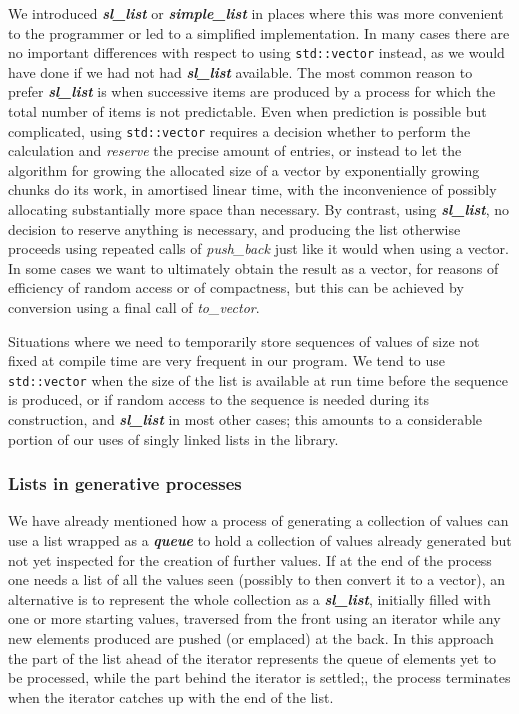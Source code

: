 \documentclass[12pt]{article}
\theoremstyle{plain}
\theoremstyle{definition}
\newcommand\std[1]{\texttt{std::#1}}
\def\vect.{\std{vector}}
\def\slls.{\textbf{\textit{sl\_\!list}}}
\def\smpl.{\textbf{\textit{simple\_\!list}}}
\def\queue.{\textbf{\textit{queue}}}
\begin{document}
We introduced \slls. or \smpl. in places where this was more convenient to the
programmer or led to a simplified implementation. In many cases there are no
important differences with respect to using \vect. instead, as we would have
done if we had not had \slls. available. The most common reason to prefer \slls.
is when successive items are produced by a process for which the total number of
items is not predictable. Even when prediction is possible but complicated,
using \vect. requires a decision whether to perform the calculation and
\textit{reserve} the precise amount of entries, or instead to let the algorithm
for growing the allocated size of a vector by exponentially growing chunks do
its work, in amortised linear time, with the inconvenience of possibly
allocating substantially more space than necessary. By contrast, using \slls.,
no decision to reserve anything is necessary, and producing the list otherwise
proceeds using repeated calls of \textit{push\_\!back} just like it would when
using a vector. In some cases we want to ultimately obtain the result as a
vector, for reasons of efficiency of random access or of compactness, but
this can be achieved by conversion using a final call of \textit{to\_\!vector}.

Situations where we need to temporarily store sequences of values of size not
fixed at compile time are very frequent in our program. We tend to use
\vect. when the size of the list is available at run time before the
sequence is produced, or if random access to the sequence is needed during its
construction, and \slls. in most other cases; this amounts to a considerable
portion of our uses of singly linked lists in the library.

\subsubsection{Lists in generative processes}

We have already mentioned how a process of generating a collection of values can
use a list wrapped as a \queue. to hold a collection of values already generated
but not yet inspected for the creation of further values. If at the end of the
process one needs a list of all the values seen (possibly to then convert it to
a vector), an alternative is to represent the whole collection as a \slls.,
initially filled with one or more starting values, traversed from the front
using an iterator while any new elements produced are pushed (or emplaced) at
the back. In this approach the part of the list ahead of the iterator represents
the queue of elements yet to be processed, while the part behind the iterator is
settled;, the process terminates when the iterator catches up with the end of
the list.
\end{document}
